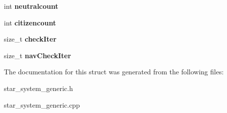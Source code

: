 \begin{DoxyCompactItemize}
\item 
int {\bfseries neutralcount}\hypertarget{structStarSystem_1_1Statistics_a250fff614f35d6973415044cffb85c6c}{}\label{structStarSystem_1_1Statistics_a250fff614f35d6973415044cffb85c6c}

\item 
int {\bfseries citizencount}\hypertarget{structStarSystem_1_1Statistics_a938137d02928ca68c3c9ce982d7f309b}{}\label{structStarSystem_1_1Statistics_a938137d02928ca68c3c9ce982d7f309b}

\item 
size\+\_\+t {\bfseries check\+Iter}\hypertarget{structStarSystem_1_1Statistics_a727aff855fcf2e0d5667ee863ca0299b}{}\label{structStarSystem_1_1Statistics_a727aff855fcf2e0d5667ee863ca0299b}

\item 
size\+\_\+t {\bfseries nav\+Check\+Iter}\hypertarget{structStarSystem_1_1Statistics_ad53777e1118a6c008f53c88e97fbee05}{}\label{structStarSystem_1_1Statistics_ad53777e1118a6c008f53c88e97fbee05}

\end{DoxyCompactItemize}


The documentation for this struct was generated from the following files\+:\begin{DoxyCompactItemize}
\item 
star\+\_\+system\+\_\+generic.\+h\item 
star\+\_\+system\+\_\+generic.\+cpp\end{DoxyCompactItemize}
